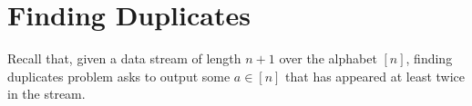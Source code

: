 \documentclass[9pt,letterpaper]{article}
\theoremstyle{remark}
\DeclareMathOperator{\polylog}{polylog}
\begin{document}
%
%
\section{Finding Duplicates}\label{sec:duplicates}
Recall that, given a data stream of length $n+1$ over the alphabet $[n]$, finding
duplicates problem asks to output some $a\in[n]$ that has appeared
at least twice in the stream.

\end{document}
